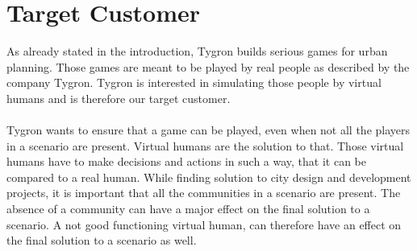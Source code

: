\section{Target Customer}
As already stated in the introduction, Tygron builds serious games for urban planning. Those games are meant to be played by real people as described by the company Tygron\cite{2016}. Tygron is interested in simulating those people by virtual humans and is therefore our target customer.\\
\\
Tygron wants to ensure that a game can be played, even when not all the players in a scenario are present. Virtual humans are the solution to that. Those virtual humans have to make decisions and actions in such a way, that it can be compared to a real human. While finding solution to city design and development projects, it is important that all the communities in a scenario are present. The absence of a community can have a major effect on the final solution to a scenario. A not good functioning virtual human, can therefore have an effect on the final solution to a scenario as well. 